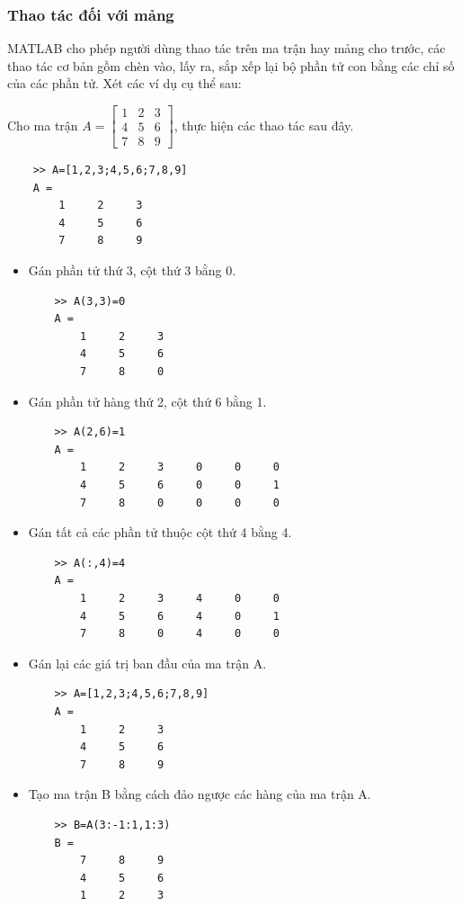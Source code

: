 \documentclass[12pt,a4paper]{article}
\begin{document}
\subsubsection{Thao tác đối với mảng}
MATLAB cho phép người dùng thao tác trên ma trận hay mảng cho trước, các thao tác cơ bản gồm chèn vào, lấy ra, sắp xếp lại bộ phần tử con bằng các chỉ số của các phần tử. Xét các ví dụ cụ thể sau:\\
\begin{example}
Cho ma trận $A=\begin{bmatrix} 1 & 2 & 3 \\ 4 & 5 & 6 \\ 7 & 8 & 9 \end{bmatrix}$, thực hiện các thao tác sau đây.\\
\begin{lstlisting}
	>> A=[1,2,3;4,5,6;7,8,9]
	A =
     	1     2     3
     	4     5     6
    	7     8     9
\end{lstlisting}
\begin{itemize}
	\item Gán phần tử thứ 3, cột thứ 3 bằng 0.
\begin{lstlisting}
	>> A(3,3)=0
	A =
     	1     2     3
     	4     5     6
     	7     8     0
\end{lstlisting}
	\item Gán phần tử hàng thứ 2, cột thứ 6 bằng 1.
\begin{lstlisting}
	>> A(2,6)=1
	A =
     	1     2     3     0     0     0
     	4     5     6     0     0     1
     	7     8     0     0     0     0
\end{lstlisting}
	\item Gán tất cả các phần tử thuộc cột thứ 4 bằng 4.
\begin{lstlisting}
	>> A(:,4)=4
	A =
     	1     2     3     4     0     0
     	4     5     6     4     0     1
     	7     8     0     4     0     0
\end{lstlisting}
	\item Gán lại các giá trị ban đầu của ma trận A.
\begin{lstlisting}
	>> A=[1,2,3;4,5,6;7,8,9]
	A =
     	1     2     3
     	4     5     6
    	7     8     9
\end{lstlisting}
	\item Tạo ma trận B bằng cách đảo ngược các hàng của ma trận A.
\begin{lstlisting}
	>> B=A(3:-1:1,1:3)
	B =
     	7     8     9
     	4     5     6
     	1     2     3
\end{lstlisting}

\end{itemize}
\end{example}
\end{document}
